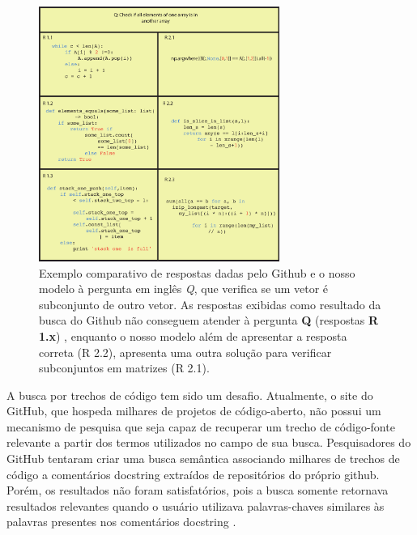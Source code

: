 \begin{figure}[H]
\centering
\includegraphics[width=0.7\textwidth]{figuras/cap-introducao/concrete_examples.pdf}
\caption[Exemplo]{Exemplo comparativo de respostas dadas pelo Github e o nosso modelo à pergunta em inglês \emph{Q}, que verifica se um vetor é subconjunto de outro vetor. As respostas exibidas como resultado da busca do Github não conseguem atender à pergunta \textbf{Q} (respostas \textbf{R 1.x}) , enquanto o nosso modelo além de apresentar a resposta correta (R 2.2), apresenta uma outra solução para verificar subconjuntos em matrizes (R 2.1). } 
\label{fig:concrete-example}
\end{figure}

A busca por trechos de código tem sido um desafio. Atualmente, o site do GitHub, que hospeda milhares de projetos de código-aberto, não possui um mecanismo de pesquisa que
seja capaz de recuperar um trecho de código-fonte relevante a partir dos termos utilizados no campo de sua busca. Pesquisadores do GitHub tentaram criar uma busca semântica associando milhares de trechos de código a comentários \gls{docstring} extraídos de repositórios do próprio \Gls{github}. Porém, os resultados não foram satisfatórios, pois a busca somente retornava resultados relevantes quando o usuário utilizava palavras-chaves similares às palavras presentes nos comentários \gls{docstring} \citep{husain-github-semantic-search-code-2019}. 

